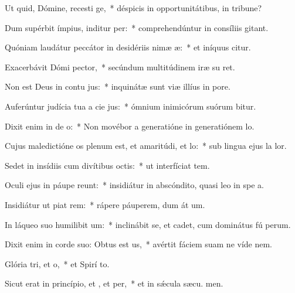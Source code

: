 \item Ut quid, Dómine, recesti ge,~* déspicis in opportunitátibus, in tribune?
\item Dum supérbit ímpius, inditur per:~* comprehendúntur in consíliis  gitant.
\item Quóniam laudátur peccátor in desidériis nimæ æ:~* et iníquus citur.
\item Exacerbávit Dómi pector,~* secúndum multitúdinem iræ su  ret.
\item Non est Deus in contu jus:~* inquinátæ sunt viæ illíus in  pore.
\item Auferúntur judícia tua a cie jus:~* ómnium inimicórum suórum bitur.
\item Dixit enim in de o:~* Non movébor a generatióne in generatiónem  lo.
\item Cujus maledictióne os plenum est, et amaritúdi, et lo:~* sub lingua ejus la  lor.
\item Sedet in insídiis cum divítibus  octis:~* ut interfíciat tem.
\item Oculi ejus in páupe reunt:~* insidiátur in abscóndito, quasi leo in spe a.
\item Insidiátur ut piat rem:~* rápere páuperem, dum át um.
\item In láqueo suo humilibit um:~* inclinábit se, et cadet, cum dominátus fú perum.
\item Dixit enim in corde suo: Obtus est us,~* avértit fáciem suam ne víde  nem.
\item Glória tri, et o,~* et Spirí to.
\item Sicut erat in princípio, et , et per,~* et in sǽcula sæcu. men.
